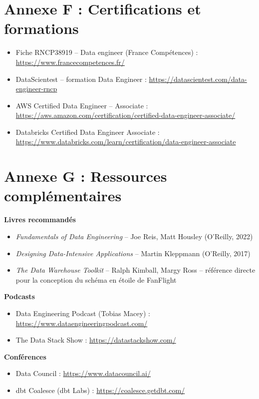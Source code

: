 \documentclass[11pt,a4paper]{report}
\begin{document}
\section*{Annexe F : Certifications et formations}

\begin{itemize}
  \item Fiche RNCP38919 -- Data engineer (France Compétences) : \url{https://www.francecompetences.fr/}
  \item DataScientest -- formation Data Engineer : \url{https://datascientest.com/data-engineer-rncp}
  \item AWS Certified Data Engineer -- Associate : \url{https://aws.amazon.com/certification/certified-data-engineer-associate/}
  \item Databricks Certified Data Engineer Associate : \url{https://www.databricks.com/learn/certification/data-engineer-associate}
\end{itemize}

\section*{Annexe G : Ressources complémentaires}

\textbf{Livres recommandés}
\begin{itemize}
  \item \emph{Fundamentals of Data Engineering} -- Joe Reis, Matt Housley (O'Reilly, 2022)
  \item \emph{Designing Data-Intensive Applications} -- Martin Kleppmann (O'Reilly, 2017)
  \item \emph{The Data Warehouse Toolkit} -- Ralph Kimball, Margy Ross -- référence directe pour la conception du schéma en étoile de FanFlight
\end{itemize}

\textbf{Podcasts}
\begin{itemize}
  \item Data Engineering Podcast (Tobias Macey) : \url{https://www.dataengineeringpodcast.com/}
  \item The Data Stack Show : \url{https://datastackshow.com/}
\end{itemize}

\textbf{Conférences}
\begin{itemize}
  \item Data Council : \url{https://www.datacouncil.ai/}
  \item dbt Coalesce (dbt Labs) : \url{https://coalesce.getdbt.com/}
\end{itemize}
\end{document}
